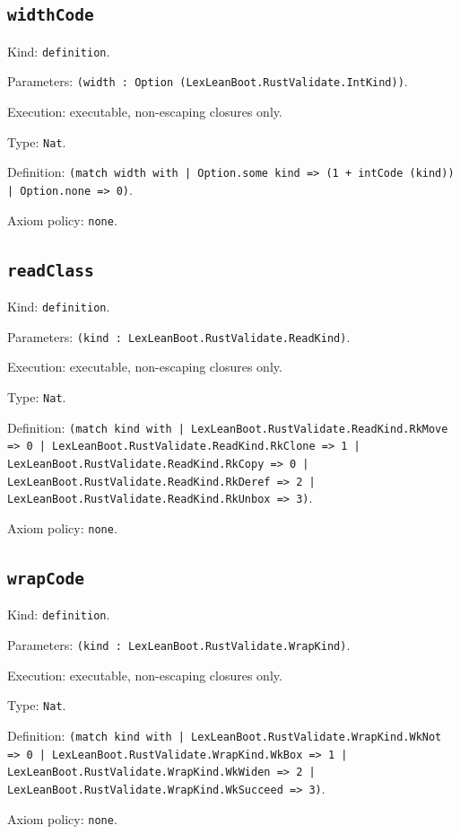 \documentclass[11pt]{article}
\begin{document}
\subsection*{\texttt{widthCode}}
\noindent Kind: \texttt{definition}.\par
\noindent Parameters: \texttt{(width : Option (LexLeanBoot.RustValidate.IntKind))}.\par
\noindent Execution: executable, non-escaping closures only.\par
\noindent Type: \texttt{Nat}.\par
\noindent Definition: \texttt{(match width with | Option.some kind => (1 + intCode (kind)) | Option.none => 0)}.\par
\noindent Axiom policy: \texttt{none}.\par
\subsection*{\texttt{readClass}}
\noindent Kind: \texttt{definition}.\par
\noindent Parameters: \texttt{(kind : LexLeanBoot.RustValidate.ReadKind)}.\par
\noindent Execution: executable, non-escaping closures only.\par
\noindent Type: \texttt{Nat}.\par
\noindent Definition: \texttt{(match kind with | LexLeanBoot.RustValidate.ReadKind.RkMove => 0 | LexLeanBoot.RustValidate.ReadKind.RkClone => 1 | LexLeanBoot.RustValidate.ReadKind.RkCopy => 0 | LexLeanBoot.RustValidate.ReadKind.RkDeref => 2 | LexLeanBoot.RustValidate.ReadKind.RkUnbox => 3)}.\par
\noindent Axiom policy: \texttt{none}.\par
\subsection*{\texttt{wrapCode}}
\noindent Kind: \texttt{definition}.\par
\noindent Parameters: \texttt{(kind : LexLeanBoot.RustValidate.WrapKind)}.\par
\noindent Execution: executable, non-escaping closures only.\par
\noindent Type: \texttt{Nat}.\par
\noindent Definition: \texttt{(match kind with | LexLeanBoot.RustValidate.WrapKind.WkNot => 0 | LexLeanBoot.RustValidate.WrapKind.WkBox => 1 | LexLeanBoot.RustValidate.WrapKind.WkWiden => 2 | LexLeanBoot.RustValidate.WrapKind.WkSucceed => 3)}.\par
\noindent Axiom policy: \texttt{none}.\par
\end{document}

